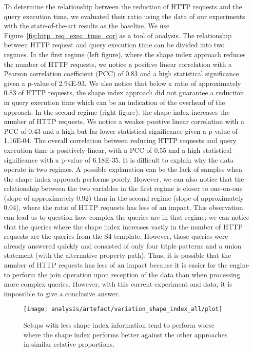 To determine the relationship between the reduction of HTTP requests and the query execution time, we evaluated their ratio using 
the data of our experiments with the state-of-the-art results as the baseline.
We use Figure~\ref{fig:http_req_exec_time_cor} as a tool of analysis.
The relationship between HTTP request and query execution time can be divided into two regimes.
In the first regime (left figure), where the shape index approach reduces the number of HTTP requests, we notice a positive linear correlation with a
Pearson correlation coefficient (PCC) of 0.83 and a high statistical significance given a p-value of 2.94E-93.
We also notice that below a ratio of approximately 0.83 of HTTP requests, the shape index approach did not guarantee a reduction in query execution time
which can be an indication of the overhead of the approach.
In the second regime (right figure), the shape index increases the number of HTTP requests.
We notice a weaker positive linear correlation with a PCC of 0.43 and a high but far lower statistical significance given a p-value of 1.16E-04.
The overall correlation between reducing HTTP requests and query execution time is positively linear, with a PCC of 0.55 and a high statistical significance with a p-value of 6.18E-35.
It is difficult to explain why the data operate in two regimes. 
A possible explanation can be the lack of samples when the shape index approach performs poorly.
However, we can also notice that the relationship between the two variables in the first regime is closer to one-on-one (slope of approximately 0.92) than in the second regime (slope of approximately 0.04), where the ratio of HTTP requests has less of an impact.
This observation can lead us to question how complex the queries are in that regime; we can notice that the queries where the shape index increases vastly in the number 
of HTTP requests are the queries from the S4 template. 
However, those queries were already answered quickly and consisted of only four triple patterns and a union statement (with the alternative property path). 
Thus, it is possible that the number of HTTP requests has less of an impact because it is easier for the engine to perform the join operation upon reception of the data than when processing more complex queries.
However, with this current experiment and data, it is impossible to give a conclusive answer.


\begin{figure}[h]
    \centering
    \texttt{[image: analysis/artefact/variation\_shape\_index\_all/plot]}
    \caption{Setups with less shape index information tend to perform worse where the shape index performs
    better against the other approaches in similar relative proportions.
    }
    \label{fig:adaptShapeIndex}
\end{figure}

